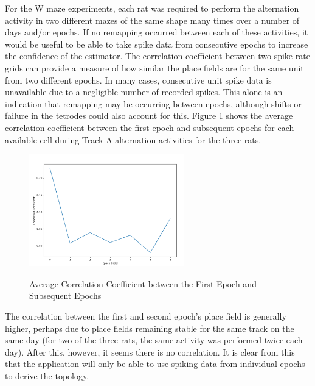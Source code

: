 \documentclass[11pt]{report}
\begin{document}
For the W maze experiments, each rat was required to perform the alternation activity in two different mazes of the same shape many times over a number of days and/or epochs. If no remapping occurred between each of these activities, it would be useful to be able to take spike data from consecutive epochs to increase the confidence of the estimator. The correlation coefficient between two spike rate grids can provide a measure of how similar the place fields are for the same unit from two different epochs. In many cases, consecutive unit spike data is unavailable due to a negligible number of recorded spikes. This alone is an indication that remapping may be occurring between epochs, although shifts or failure in the tetrodes could also account for this. Figure \ref{fig:f} shows the average correlation coefficient between the first epoch and subsequent epochs for each available cell during Track A alternation activities for the three rats.

\begin{figure}[h!]
\caption{Average Correlation Coefficient between the First Epoch and Subsequent Epochs }
\centering
  \includegraphics[width=0.6\textwidth]{correlation_by_epoch}
\label{fig:f}
\end{figure}
 
The correlation between the first and second epoch’s place field is generally higher, perhaps due to place fields remaining stable for the same track on the same day (for two of the three rats, the same activity was performed twice each day). After this, however, it seems there is no correlation. It is clear from this that the application will only be able to use spiking data from individual epochs to derive the topology. \\
 
\end{document}
